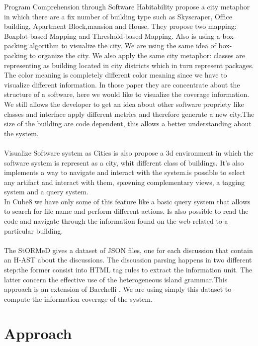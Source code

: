 \documentclass[]{usiinfbachelorproject}
\begin{document}
Program Comprehension through Software Habitability \cite{programComp} propose a city metaphor in which there are a fix number  of building type such as Skyscraper, Office building, Apartment Block,mansion and House. They propose two mapping: Boxplot-based Mapping and Threshold-based Mapping. Also is using a box-packing algorithm to visualize the city.  We are using the same idea of box-packing to organize the city. We also apply the same city metaphor: classes are representing as building located in city districts which in turn represent packages. \\The color meaning is completely different color meaning since we have to visualize different information. In those paper they are concentrate about the structure of a software, here we would like to visualize the coverage information. We still allows the developer to get an idea about other software propriety like classes and interface apply different metrics and therefore generate a new city.The size of the building are code dependent, this allows a better understanding about the system. \\ \\
Visualize Software system as Cities \cite{vssac} is also propose a 3d environment in which the software system is represent as a city, whit different class of buildings. It's also implements a way to navigate and interact with the system.is possible to select any artifact and interact with them, spawning complementary views,  a tagging system and a query system.\\
In Cube8 we have only some of this feature like a basic query system that allows to search for  file name and perform different actions. Is also possible to read the code and navigate through the information found on the web related to a particular building.\\ \\


The StORMeD \cite{stormy} gives a dataset of JSON files, one for each discussion that contain an H-AST about the discussions. The discussion parsing happens in two different step:the former consist into  HTML tag rules to extract the information unit. The latter concern the effective use of the  heterogeneous island grammar.This approach is an extension of Bacchelli \cite{Bacchelli}.  
 We are using simply this dataset to compute the information coverage of the system.

 




\pagebreak
\section{Approach} \label{approach}
\end{document}
